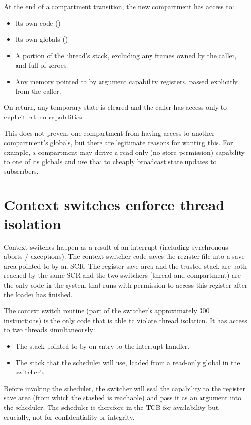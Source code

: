 At the end of a compartment transition, the new compartment has access to:

\begin{itemize}
	\item Its own code (\PCC)
	\item Its own globals (\CGP)
	\item A portion of the thread's stack, excluding any frames owned by the caller, and full of zeroes.
	\item Any memory pointed to by argument capability registers, passed explicitly from the caller.
\end{itemize}

On return, any temporary state is cleared and the caller has access only to explicit return capabilities.

This does not prevent one compartment from having access to another compartment's globals, but there are legitimate reasons for wanting this.
For example, a compartment may derive a read-only (no store permission) capability to one of its globals and use that to cheaply broadcast state updates to subscribers.

\section{Context switches enforce thread isolation}

Context switches happen as a result of an interrupt (including synchronous aborts / exceptions).
The context switcher code saves the register file into a save area pointed to by an SCR.
The register save area and the trusted stack are both reached by the same SCR and the two switchers (thread and compartment) are the only code in the system that runs with permission to access this register after the loader has finished.

The context switch routine (part of the switcher's approximately 300 instructions) is the only code that is able to violate thread isolation.
It has access to two threads simultaneously:

\begin{itemize}
	\item The stack pointed to by \CSP{} on entry to the interrupt handler.
	\item The stack that the scheduler will use, loaded from a read-only global in the switcher's \PCC{}.
\end{itemize}

Before invoking the scheduler, the switcher will seal the capability to the register save area (from which the stashed \CSP{} is reachable) and pass it as an argument into the scheduler.
The scheduler is therefore in the TCB for availability but, crucially, not for confidentiality or integrity.

